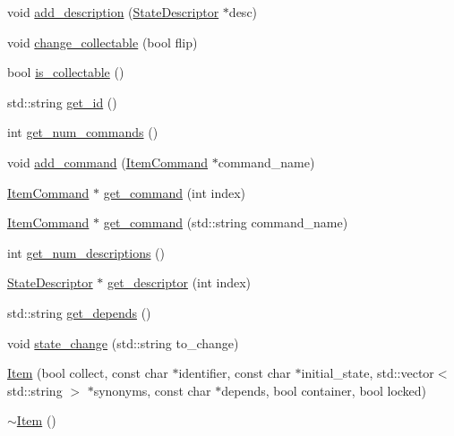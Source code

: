\begin{DoxyCompactItemize}
\item 
void \hyperlink{class_item_af6e0efea4346f669ac5479b258511e68}{add\-\_\-description} (\hyperlink{class_state_descriptor}{\-State\-Descriptor} $\ast$desc)
\item 
void \hyperlink{class_item_ab8c43c172fbff161c8c2ca765ded9537}{change\-\_\-collectable} (bool flip)
\item 
bool \hyperlink{class_item_a91f14a96cab681bc02dee3f9c9e6af5d}{is\-\_\-collectable} ()
\item 
std\-::string \hyperlink{class_item_a7a3aedd7ab7f81327f57343dcb55d42d}{get\-\_\-id} ()
\item 
int \hyperlink{class_item_a9f09c704274546d5bd0903d0cddfd194}{get\-\_\-num\-\_\-commands} ()
\item 
void \hyperlink{class_item_ab78d891c3aed983ea7b2e5311b0da68c}{add\-\_\-command} (\hyperlink{class_item_command}{\-Item\-Command} $\ast$command\-\_\-name)
\item 
\hyperlink{class_item_command}{\-Item\-Command} $\ast$ \hyperlink{class_item_a2d460d0ac5130e9fd5c05bd3d823a224}{get\-\_\-command} (int index)
\item 
\hyperlink{class_item_command}{\-Item\-Command} $\ast$ \hyperlink{class_item_a62cc63f4b60feeb555226eceb851d7de}{get\-\_\-command} (std\-::string command\-\_\-name)
\item 
int \hyperlink{class_item_a41e3300333fa679000fa94f6d5073268}{get\-\_\-num\-\_\-descriptions} ()
\item 
\hyperlink{class_state_descriptor}{\-State\-Descriptor} $\ast$ \hyperlink{class_item_a53ca85af0ed1581f08b7cb143ea9474c}{get\-\_\-descriptor} (int index)
\item 
std\-::string \hyperlink{class_item_abccfd47cb27c2631d90e44a7341bb3b3}{get\-\_\-depends} ()
\item 
void \hyperlink{class_item_a3ec1f16ad405a8ddf9ae82a48de551ff}{state\-\_\-change} (std\-::string to\-\_\-change)
\item 
\hyperlink{class_item_ae9685a7de5cdc12e508e8cf4fea89463}{\-Item} (bool collect, const char $\ast$identifier, const char $\ast$initial\-\_\-state, std\-::vector$<$ std\-::string $>$ $\ast$synonyms, const char $\ast$depends, bool container, bool locked)
\item 
\hyperlink{class_item_a11663c84075b78c3ae5e30fdfcd7c458}{$\sim$\-Item} ()
\end{DoxyCompactItemize}
